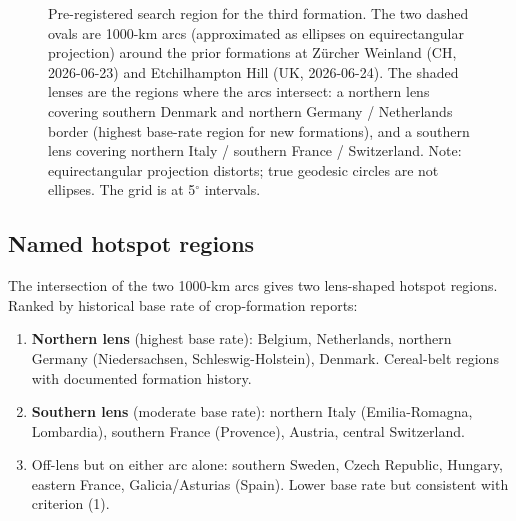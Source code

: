 \documentclass[11pt,a4paper]{article}
\begin{document}
\begin{landscape}
\begin{figure}[H]
\caption{Pre-registered search region for the third formation. The two dashed ovals are 1000-km arcs (approximated as ellipses on equirectangular projection) around the prior formations at Z\"urcher Weinland (CH, 2026-06-23) and Etchilhampton Hill (UK, 2026-06-24). The shaded lenses are the regions where the arcs intersect: a northern lens covering southern Denmark and northern Germany / Netherlands border (highest base-rate region for new formations), and a southern lens covering northern Italy / southern France / Switzerland. Note: equirectangular projection distorts; true geodesic circles are not ellipses. The grid is at 5$^{\circ}$ intervals.}
\label{fig:map}
\end{figure}
\end{landscape}

\subsection{Named hotspot regions}

The intersection of the two 1000-km arcs gives two lens-shaped hotspot regions. Ranked by historical base rate of crop-formation reports:

\begin{enumerate}
  \item \textbf{Northern lens} (highest base rate): Belgium, Netherlands, northern Germany (Niedersachsen, Schleswig-Holstein), Denmark. Cereal-belt regions with documented formation history.
  \item \textbf{Southern lens} (moderate base rate): northern Italy (Emilia-Romagna, Lombardia), southern France (Provence), Austria, central Switzerland.
  \item Off-lens but on either arc alone: southern Sweden, Czech Republic, Hungary, eastern France, Galicia/Asturias (Spain). Lower base rate but consistent with criterion (1).
\end{enumerate}
\end{document}
